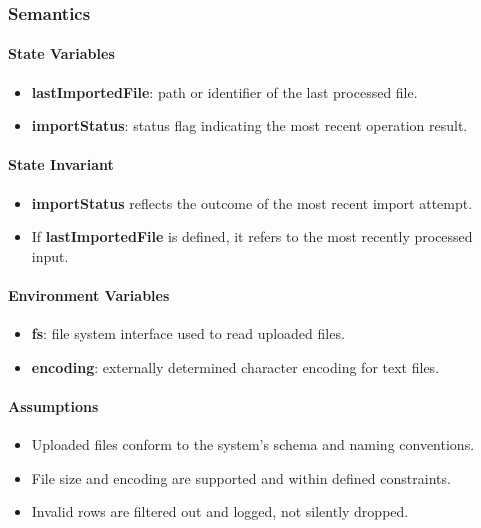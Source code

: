 \documentclass[12pt, titlepage]{article}
\begin{document}
\subsubsection{Semantics}

\paragraph{State Variables}
\begin{itemize}
  \item \textbf{lastImportedFile}: path or identifier of the last processed file.
  \item \textbf{importStatus}: status flag indicating the most recent operation result.
\end{itemize}

\paragraph{State Invariant}
\begin{itemize}
  \item \textbf{importStatus} reflects the outcome of the most recent import attempt.
  \item If \textbf{lastImportedFile} is defined, it refers to the most recently processed input.
\end{itemize}


\paragraph{Environment Variables}
\begin{itemize}
  \item \textbf{fs}: file system interface used to read uploaded files.
  \item \textbf{encoding}: externally determined character encoding for text files.
\end{itemize}

\paragraph{Assumptions}
\begin{itemize}
  \item Uploaded files conform to the system’s schema and naming conventions.
  \item File size and encoding are supported and within defined constraints.
  \item Invalid rows are filtered out and logged, not silently dropped.
\end{itemize}
\end{document}
